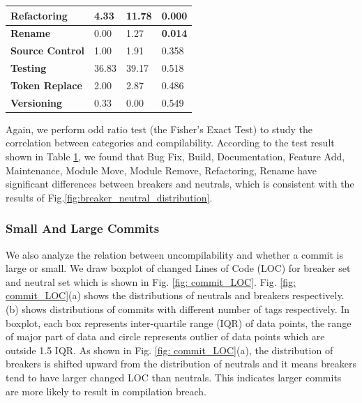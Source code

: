 \begin{table}[htbp]
\begin{tabular}{llll}
      \hline
      \textbf{Refactoring} & 4.33  & 11.78  & \textbf{0.000} \\
      \hline
      \textbf{Rename} & 0.00  & 1.27  & \textbf{0.014} \\
      \hline
      \textbf{Source Control} & 1.00  & 1.91  & 0.358  \\
      \hline
      \textbf{Testing} & 36.83  & 39.17  & 0.518  \\
      \hline
      \textbf{Token Replace} & 2.00  & 2.87  & 0.486  \\
      \hline
      \textbf{Versioning} & 0.33  & 0.00  & 0.549  \\
      \hline
      \end{tabular}%
    \label{tab:breaker_neutral}%
  \end{table}%

Again, we perform odd ratio test (the Fisher's Exact Test) to study the correlation between categories and compilability. 
According to the test result shown in Table \ref{tab:breaker_neutral}, we found that Bug Fix, Build, Documentation, Feature Add, Maintenance, Module Move, Module Remove, Refactoring, Rename have significant differences between breaker{}s and neutral{}s, which is consistent with the results of Fig.\ref{fig:breaker_neutral_distribution}.

\subsubsection{Small And Large Commits}

We also analyze the relation between uncompilability and whether a commit is large or small. 
We draw boxplot of changed Lines of Code (LOC) for breaker set and neutral set which is shown in Fig. \ref{fig: commit_LOC}.
Fig. \ref{fig: commit_LOC}(a) shows the distributions of neutrals and breakers respectively. 
(b) shows distributions of commits with different number of tags respectively. 
In boxplot, each box represents inter-quartile range (IQR) of data points, the range of major part of data and circle represents outlier of data points which are outside 1.5 IQR.
As shown in Fig. \ref{fig: commit_LOC}(a), the distribution of breaker{}s is shifted upward from the distribution of neutral{}s and it means breaker{}s tend to have larger changed LOC than neutral{}s. 
This indicates larger commits are more likely to result in compilation breach.


